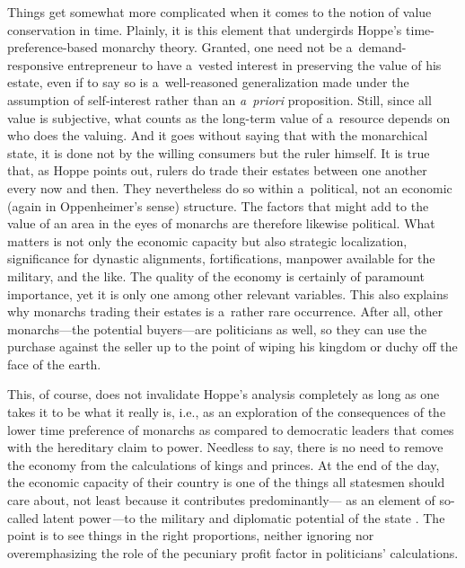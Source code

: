 Things get somewhat more complicated when it comes to the notion of value conservation in time. Plainly, it is this element that undergirds Hoppe's time-preference-based monarchy theory. Granted, one need not be a~demand-responsive entrepreneur to have a~vested interest in preserving the value of his estate, even if to say so is a~well-reasoned generalization made under the assumption of self-interest rather than an \textit{a~priori} proposition. Still, since all value is subjective, what counts as the long-term value of a~resource depends on who does the valuing. And it goes without saying that with the monarchical state, it is done not by the willing consumers but the ruler himself. It is true that, as Hoppe 
\parencite*[][p.18]{hoppe_democracy_2007} %
 points out, rulers do trade their estates between one another every now and then. They nevertheless do so within a~political, not an economic (again in Oppenheimer's sense) structure. The factors that might add to the value of an area in the eyes of monarchs are therefore likewise political. What matters is not only the economic capacity but also strategic localization, significance for dynastic alignments, fortifications, manpower available for the military, and the like. The quality of the economy is certainly of paramount importance, yet it is only one among other relevant variables. This also explains why monarchs trading their estates is a~rather rare occurrence. After all, other monarchs---the potential buyers---are politicians as well, so they can use the purchase against the seller up to the point of wiping his kingdom or duchy off the face of the earth.



This, of course, does not invalidate Hoppe's analysis completely as long as one takes it to be what it really is, i.e., as an exploration of the consequences of the lower time preference of monarchs as compared to democratic leaders that comes with the hereditary claim to power. Needless to say, there is no need to remove the economy from the calculations of kings and princes. At the end of the day, the economic capacity of their country is one of the things all statesmen should care about, not least because it contributes predominantly--- as an element of so-called latent power\textit{---}to the military and diplomatic potential of the state 
\parencite[][chap. 3]{mearsheimer_tragedy_2001}. %
 The point is to see things in the right proportions, neither ignoring nor overemphasizing the role of the pecuniary profit factor in politicians' calculations.



